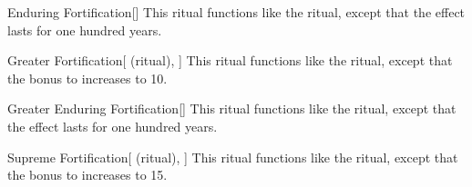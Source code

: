 \lowercase{\hypertarget{spell:Enduring Fortification}{}}\label{spell:Enduring Fortification}
\begin{apability}[Rank 4]{\hypertarget{spell:Enduring Fortification}{Enduring Fortification}}[]
This ritual functions like the  ritual, except that the effect lasts for one hundred years.
\end{apability}
\vspace{0.25em}



\lowercase{\hypertarget{spell:Greater Fortification}{}}\label{spell:Greater Fortification}
\begin{attuneability}[Rank 4]{\hypertarget{spell:Greater Fortification}{Greater Fortification}}[ (ritual), ]
This ritual functions like the  ritual, except that the bonus to  increases to 10.
\end{attuneability}
\vspace{0.25em}



\lowercase{\hypertarget{spell:Greater Enduring Fortification}{}}\label{spell:Greater Enduring Fortification}
\begin{apability}[Rank 5]{\hypertarget{spell:Greater Enduring Fortification}{Greater Enduring Fortification}}[]
This ritual functions like the  ritual, except that the effect lasts for one hundred years.
\end{apability}
\vspace{0.25em}



\lowercase{\hypertarget{spell:Supreme Fortification}{}}\label{spell:Supreme Fortification}
\begin{attuneability}[Rank 7]{\hypertarget{spell:Supreme Fortification}{Supreme Fortification}}[ (ritual), ]
This ritual functions like the  ritual, except that the bonus to  increases to 15.
\end{attuneability}
\vspace{0.25em}


